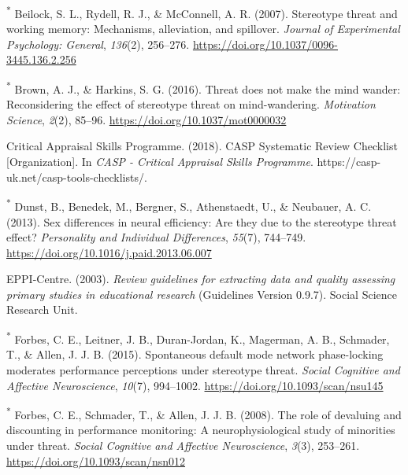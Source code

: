 \documentclass[
  stu,floatsintext]{apa7}
\newlength{\cslhangindent}
\newenvironment{CSLReferences}[2] %
 {\begin{list}{}{%
  \setlength{\itemindent}{0pt}
  \setlength{\leftmargin}{0pt}
  \setlength{\parsep}{0pt}
  \ifodd #1
   \setlength{\leftmargin}{\cslhangindent}
   \setlength{\itemindent}{-1\cslhangindent}
  \fi
  \setlength{\itemsep}{#2\baselineskip}}}
 {\end{list}}
\begin{document}
\begin{CSLReferences}{1}{0}
\textsuperscript{*} Beilock, S. L., Rydell, R. J., \& McConnell, A. R. (2007). Stereotype threat and working memory: {Mechanisms}, alleviation, and spillover. \emph{Journal of Experimental Psychology: General}, \emph{136}(2), 256--276. \url{https://doi.org/10.1037/0096-3445.136.2.256}

\textsuperscript{*} Brown, A. J., \& Harkins, S. G. (2016). Threat does not make the mind wander: {Reconsidering} the effect of stereotype threat on mind-wandering. \emph{Motivation Science}, \emph{2}(2), 85--96. \url{https://doi.org/10.1037/mot0000032}

Critical Appraisal Skills Programme. (2018). {CASP Systematic Review Checklist} {[}Organization{]}. In \emph{CASP - Critical Appraisal Skills Programme}. https://casp-uk.net/casp-tools-checklists/.

\textsuperscript{*} Dunst, B., Benedek, M., Bergner, S., Athenstaedt, U., \& Neubauer, A. C. (2013). Sex differences in neural efficiency: {Are} they due to the stereotype threat effect? \emph{Personality and Individual Differences}, \emph{55}(7), 744--749. \url{https://doi.org/10.1016/j.paid.2013.06.007}

EPPI-Centre. (2003). \emph{Review guidelines for extracting data and quality assessing primary studies in educational research} (Guidelines Version 0.9.7). Social Science Research Unit.

\textsuperscript{*} Forbes, C. E., Leitner, J. B., Duran-Jordan, K., Magerman, A. B., Schmader, T., \& Allen, J. J. B. (2015). Spontaneous default mode network phase-locking moderates performance perceptions under stereotype threat. \emph{Social Cognitive and Affective Neuroscience}, \emph{10}(7), 994--1002. \url{https://doi.org/10.1093/scan/nsu145}

\textsuperscript{*} Forbes, C. E., Schmader, T., \& Allen, J. J. B. (2008). The role of devaluing and discounting in performance monitoring: A neurophysiological study of minorities under threat. \emph{Social Cognitive and Affective Neuroscience}, \emph{3}(3), 253--261. \url{https://doi.org/10.1093/scan/nsn012}


\end{CSLReferences}
\end{document}
